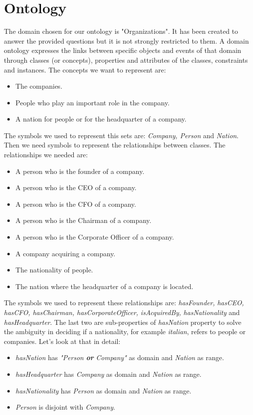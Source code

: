 \section{Ontology}
\label{sec:ontology}
The domain chosen for our ontology is "Organizations". It has been created to answer the provided questions but it is not strongly restricted to them. A domain ontology expresses the links between specific objects and events of that domain through classes (or concepts), properties and attributes of the classes, constraints and instances.
The concepts we want to represent are:
\begin{itemize}
\item The companies.
\item People who play an important role in the company.
\item A nation for people or for the headquarter of a company.
\end{itemize}
The symbols we used to represent this sets are: \textit{Company, Person} and \textit{Nation}.
Then we need symbols to represent the relationships between classes. The relationships we needed are:
\begin{itemize}
\item A person who is the founder of a company.
\item A person who is the CEO of a company.
\item A person who is the CFO of a company.
\item A person who is the Chairman of a company.
\item A person who is the Corporate Officer of a company.
\item A company acquiring a company.
\item The nationality of people.
\item The nation where the headquarter of a company is located.
\end{itemize}
The symbols we used to represent these relationships are: \textit{hasFounder, hasCEO, hasCFO, hasChairman, hasCorporateOfficer, isAcquiredBy, hasNationality} and \textit{hasHeadquarter}. 
The last two are sub-properties of \textit{hasNation} property to solve the ambiguity in deciding if a nationality, for example \textit{italian}, refers to people or companies. Let's look at that in detail:
\begin{itemize}
\item \textit{hasNation} has \textit{"Person \textbf{or} Company"} as domain and \textit{Nation} as range.
\item \textit{hasHeadquarter} has \textit{Company} as domain and \textit{Nation} as range.
\item \textit{hasNationality} has \textit{Person} as domain and \textit{Nation} as range.
\item \textit{Person} is disjoint with \textit{Company}.
\end{itemize}

